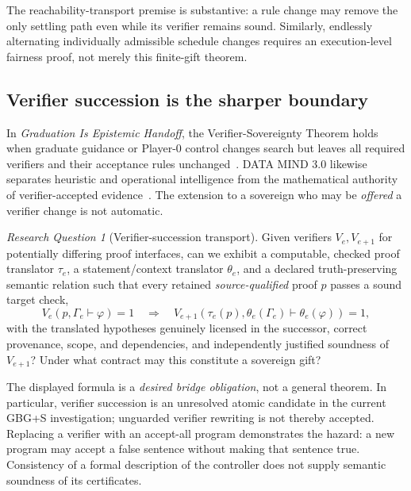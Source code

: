 \documentclass[11pt,letterpaper]{article}
\theoremstyle{definition}\newtheorem{definition}[theorem]{Definition}\newtheorem{example}[theorem]{Example}
\theoremstyle{remark}\newtheorem{remark}[theorem]{Remark}
\newtheorem{question}[theorem]{Research Question}
\begin{document}
The reachability-transport premise is substantive: a rule change may remove the only settling path even while its verifier remains sound. Similarly, endlessly alternating individually admissible schedule changes requires an execution-level fairness proof, not merely this finite-gift theorem.

\subsection{Verifier succession is the sharper boundary}
In \emph{Graduation Is Epistemic Handoff}, the Verifier-Sovereignty Theorem holds when graduate guidance or Player-0 control changes search but leaves all required verifiers and their acceptance rules unchanged~\cite{mvsi:Graduation}. DATA MIND 3.0 likewise separates heuristic and operational intelligence from the mathematical authority of verifier-accepted evidence~\cite{mvsi:DataMind}. The extension to a sovereign who may be \emph{offered} a verifier change is not automatic.

\begin{question}[Verifier-succession transport]\label{mvsi:q:verifier}
Given verifiers $V_e,V_{e+1}$ for potentially differing proof interfaces, can we exhibit a computable, checked proof translator $\tau_e$, a statement/context translator $\theta_e$, and a declared truth-preserving semantic relation such that every retained \emph{source-qualified} proof $p$ passes a sound target check,
\[
V_e(p,\Gamma_e\vdash\varphi)=1\quad\Longrightarrow\quad
V_{e+1}(\tau_e(p),\theta_e(\Gamma_e)\vdash\theta_e(\varphi))=1,
\]
with the translated hypotheses genuinely licensed in the successor, correct provenance, scope, and dependencies, and independently justified soundness of $V_{e+1}$? Under what contract may this constitute a sovereign gift?
\end{question}

The displayed formula is a \emph{desired bridge obligation}, not a general theorem. In particular, verifier succession is an unresolved atomic candidate in the current GBG+S investigation; unguarded verifier rewriting is not thereby accepted. Replacing a verifier with an accept-all program demonstrates the hazard: a new program may accept a false sentence without making that sentence true. Consistency of a formal description of the controller does not supply semantic soundness of its certificates.
\end{document}

